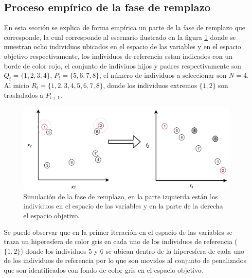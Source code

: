 \subsection*{Proceso empírico de la fase de remplazo}

En esta sección se explica de forma empírica un parte de la fase de remplazo que corresponde, la cual corresponde al escenario ilustrado en la figura \ref{fig:Simulacion_1} donde se muestran ocho individuos ubicados en el espacio de las variables y en el espacio objetivo respectivamente, los individuos de referencia estan indicados con un borde de color rojo, el conjunto de indiviuos hijos y padres respectivamente son $Q_t = \{1,2,3,4\}$, $P_{t} = \{5,6,7,8\}$, el número de individuos a seleccionar son $N=4$. 
%
Al inicio $R_t = \{1, 2, 3, 4, 5, 6, 7, 8 \}$, donde los individuos extremos $\{1, 2\}$ son trasladados a $P_{t+1}$.
%
\begin{figure}[H]
\centering
\scriptsize
\includegraphics[scale=0.2]
{Figures_Chapter3/Fase_Remplazo_1.png}
\decoRule
\caption{Simulación de la fase de remplazo, en la parte izquierda están los individuos en el espacio de las variables y en la parte de la derecha el espacio objetivo.}
\label{fig:Simulacion_1}
\end{figure}


Se puede observar que en la primer iteración en el espacio de las variables se traza un hiperesfera de color gris en cada uno de los individuos de referencia ($\{1, 2\}$) donde los individuos $5$ y $6$ se ubican dentro de la hiperesfera de cada uno de los individuos de referencia por lo que son movidos al conjunto de penalizados que son identificados con fondo de color gris en el espacio objetivo.
%


